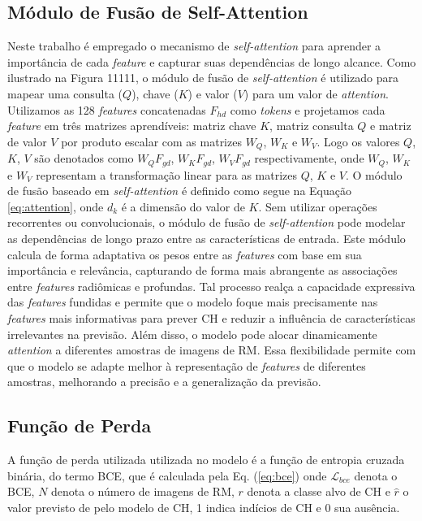 \subsection{Módulo de Fusão de Self-Attention}
\label{subsec:cap4_mod_self_attention}

Neste trabalho é empregado o mecanismo de \textit{self-attention} para aprender a importância de cada \textit{feature} e capturar suas dependências de longo alcance. Como ilustrado na Figura 11111, o módulo de fusão de \textit{self-attention} é utilizado para mapear uma consulta ($Q$), chave ($K$) e valor ($V$) para um valor de \textit{attention}. Utilizamos as 128 \textit{features} concatenadas $F_{hd}$  como \textit{tokens} e projetamos cada \textit{feature} em três matrizes aprendíveis: matriz chave $K$, matriz consulta $Q$ e matriz de valor $V$ por produto escalar com as matrizes $W_{Q}$, $W_{K}$ e $W_{V}$. Logo os valores $Q$, $K$, $V$ são denotados como $W_{Q}F_{gd}$, $W_{K}F_{gd}$, $W_{V}F_{gd}$ respectivamente, onde $W_{Q}$, $W_{K}$ e $W_{V}$ representam a transformação linear para as matrizes $Q$, $K$ e $V$. O módulo de fusão baseado em \textit{self-attention} é definido como segue na Equação \ref{eq:attention}, onde $d_{k}$ é a dimensão do valor de $K$. Sem utilizar operações recorrentes ou convolucionais, o módulo de fusão de \textit{self-attention} pode modelar as dependências de longo prazo entre as características de entrada.      Este módulo calcula de forma adaptativa os pesos entre as \textit{features} com base em sua importância e relevância, capturando de forma mais abrangente as associações entre \textit{features} radiômicas e profundas. Tal processo realça a capacidade expressiva das \textit{features} fundidas e permite que o modelo foque mais precisamente nas \textit{features} mais informativas para prever \gls{CH} e reduzir a influência de características irrelevantes na previsão. Além disso, o modelo pode alocar dinamicamente \textit{attention} a diferentes amostras de imagens de \gls{RM}. Essa flexibilidade permite com que o modelo se adapte melhor à representação de \textit{features} de diferentes amostras, melhorando a precisão e a generalização da previsão.

\subsection{Função de Perda}
\label{subsec:cap4_funcao_perda}

A função de perda utilizada utilizada no modelo é a função de entropia cruzada binária, do termo  \gls{BCE}, que é calculada pela Eq. (\ref{eq:bce}) onde $\mathcal{L}_{bce}$ denota o \gls{BCE}, $N$ denota o número de imagens de \gls{RM}, $r$ denota a classe alvo de \gls{CH} e $\hat{r}$ o valor previsto de pelo modelo de \gls{CH}, 1 indica indícios de \gls{CH} e 0 sua ausência.

